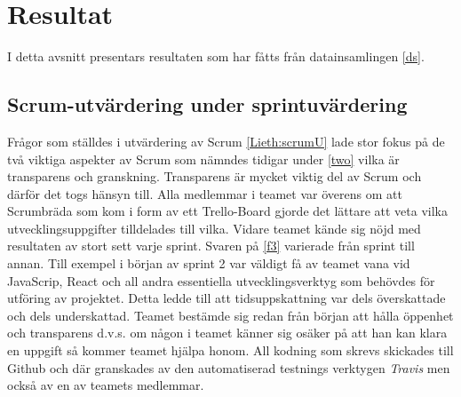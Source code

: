 \section{Resultat}
\label{sec:Lieth_Wahid-results}
I detta avsnitt presentars resultaten som har fåtts från datainsamlingen \ref{ds}.
\subsection{Scrum-utvärdering under sprintuvärdering}
Frågor som ställdes i utvärdering av Scrum \ref{Lieth:scrumU} lade stor fokus på de två viktiga aspekter av Scrum som nämndes tidigar under \ref{two} vilka är transparens och granskning.
Transparens är mycket viktig del av Scrum och därför det togs hänsyn till. Alla medlemmar i teamet var överens om att Scrumbräda som kom i form av ett Trello-Board gjorde det lättare att veta vilka 
utvecklingsuppgifter tilldelades till vilka. Vidare teamet kände sig nöjd med resultaten av stort sett varje sprint. Svaren på \ref{f3} varierade från sprint till annan. Till exempel i början av sprint 2 var väldigt få av teamet  
vana vid JavaScrip, React och all andra essentiella utvecklingsverktyg som behövdes för utföring av projektet. Detta ledde till att tidsuppskattning var dels överskattade och dels underskattad. Teamet bestämde sig redan från
början att hålla öppenhet och transparens d.v.s. om någon i teamet känner sig osäker på att han kan klara en uppgift så kommer teamet hjälpa honom. All kodning som skrevs skickades till Github och där granskades av den automatiserad testnings verktygen \textit{Travis} men också av en av teamets medlemmar.

